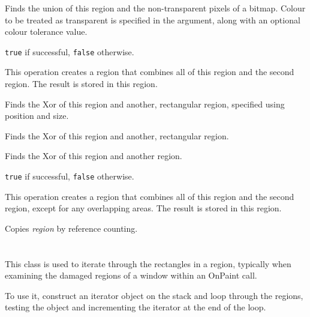 Finds the union of this region and the non-transparent pixels of a
bitmap. Colour to be treated as transparent is specified in the
 argument, along with an
optional colour tolerance value.


{\tt true} if successful, {\tt false} otherwise.


This operation creates a region that combines all of this region and the second region.
The result is stored in this region.


\label{wxregionxor}


Finds the Xor of this region and another, rectangular region, specified using position and size.


Finds the Xor of this region and another, rectangular region.


Finds the Xor of this region and another region.


{\tt true} if successful, {\tt false} otherwise.


This operation creates a region that combines all of this region and the second region, except
for any overlapping areas. The result is stored in this region.


\label{wxregionassign}


Copies {\it region} by reference counting.

\section{}\label{wxregioniterator}

This class is used to iterate through the rectangles in a region,
typically when examining the damaged regions of a window within an OnPaint call.

To use it, construct an iterator object on the stack and loop through the
regions, testing the object and incrementing the iterator at the end of the loop.

